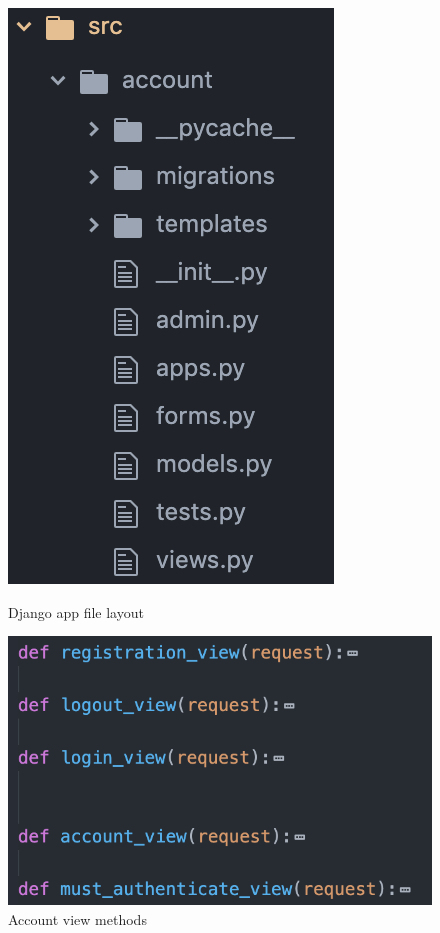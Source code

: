 \begin{figure}[htbp]
\begin{minipage}[t]{0.45\linewidth}
    \includegraphics[scale=0.5]{Figures/apps_django}
    \caption{Django app file layout}
    \label{apps_django}
\end{minipage}%
    \hfill%
\begin{minipage}[t]{0.45\linewidth}
    \includegraphics[width=\linewidth]{Figures/account_view}
    \caption{Account view methods}
    \label{account_view}
\end{minipage}
\end{figure}

